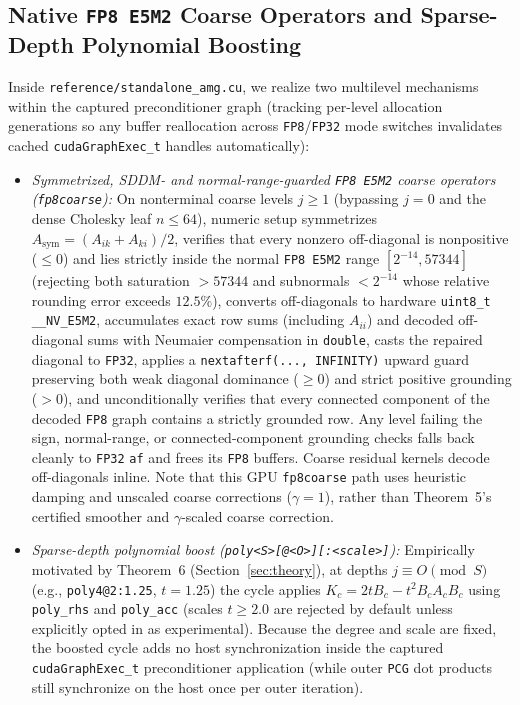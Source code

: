\documentclass[10pt]{article}
\begin{document}
\subsection{Native \texttt{FP8 E5M2} Coarse Operators and Sparse-Depth Polynomial Boosting}
Inside \texttt{reference/standalone\_amg.cu}, we realize two multilevel mechanisms within the captured preconditioner graph (tracking per-level allocation generations so any buffer reallocation across \texttt{FP8}/\texttt{FP32} mode switches invalidates cached \texttt{cudaGraphExec\_t} handles automatically):
\begin{itemize}
  \item \emph{Symmetrized, SDDM- and normal-range-guarded \texttt{FP8 E5M2} coarse operators (\texttt{fp8coarse}):} On nonterminal coarse levels $j \ge 1$ (bypassing $j = 0$ and the dense Cholesky leaf $n \le 64$), numeric setup symmetrizes $A_{\mathrm{sym}} = (A_{ik} + A_{ki})/2$, verifies that every nonzero off-diagonal is nonpositive ($\le 0$) and lies strictly inside the normal \texttt{FP8 E5M2} range $[2^{-14}, 57344]$ (rejecting both saturation $> 57344$ and subnormals $< 2^{-14}$ whose relative rounding error exceeds $12.5\%$), converts off-diagonals to hardware \texttt{uint8\_t} \texttt{\_\_NV\_E5M2}, accumulates exact row sums (including $A_{ii}$) and decoded off-diagonal sums with Neumaier compensation in \texttt{double}, casts the repaired diagonal to \texttt{FP32}, applies a \texttt{nextafterf(..., INFINITY)} upward guard preserving both weak diagonal dominance ($\ge 0$) and strict positive grounding ($> 0$), and unconditionally verifies that every connected component of the decoded \texttt{FP8} graph contains a strictly grounded row. Any level failing the sign, normal-range, or connected-component grounding checks falls back cleanly to \texttt{FP32} \texttt{af} and frees its \texttt{FP8} buffers. Coarse residual kernels decode off-diagonals inline. Note that this GPU \texttt{fp8coarse} path uses heuristic damping and unscaled coarse corrections ($\gamma = 1$), rather than Theorem~5's certified smoother and $\gamma$-scaled coarse correction.
  \item \emph{Sparse-depth polynomial boost (\texttt{poly<S>[@<O>][:<scale>]}):} Empirically motivated by Theorem~6 (Section~\ref{sec:theory}), at depths $j \equiv O \pmod S$ (e.g., \texttt{poly4@2:1.25}, $t = 1.25$) the cycle applies $K_c = 2 t B_c - t^2 B_c A_c B_c$ using \texttt{poly\_rhs} and \texttt{poly\_acc} (scales $t \ge 2.0$ are rejected by default unless explicitly opted in as experimental). Because the degree and scale are fixed, the boosted cycle adds no host synchronization inside the captured \texttt{cudaGraphExec\_t} preconditioner application (while outer \texttt{PCG} dot products still synchronize on the host once per outer iteration).
\end{itemize}
\end{document}
